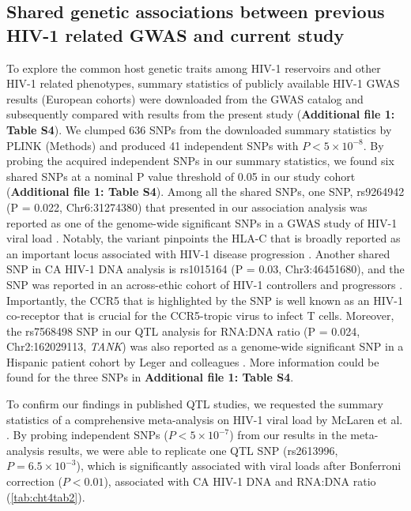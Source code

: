 \documentclass{book}
\begin{document}
\begin{refsection}
\subsection*{Shared genetic associations between previous HIV-1 related GWAS and current study}
To explore the common host genetic traits among HIV-1 reservoirs and other HIV-1 related phenotypes, summary statistics of publicly available HIV-1 GWAS results (European cohorts) were downloaded from the GWAS catalog \cite{Buniello2018The} and subsequently compared with results from the present study (\textbf{Additional file 1: Table S4}).
We clumped 636 SNPs from the downloaded summary statistics by PLINK \cite{Purcell2007PLINK} (Methods) and produced 41 independent SNPs with $P < 5 \times 10^{-8}$.
By probing the acquired independent SNPs in our summary statistics, we found six shared SNPs at a nominal P value threshold of 0.05 in our study cohort (\textbf{Additional file 1: Table S4}).
Among all the shared SNPs, one SNP, rs9264942 (P = 0.022, Chr6:31274380) that presented in our association analysis was reported as one of the genome-wide significant SNPs in a GWAS study of HIV-1 viral load \cite{Herráiz2017Impact}.
Notably, the variant pinpoints the HLA-C that is broadly reported as an important locus associated with HIV-1 disease progression \cite{Kulpa2011The}.
Another shared SNP in CA HIV-1 DNA analysis is rs1015164 (P = 0.03, Chr3:46451680), and the SNP was reported in an across-ethic cohort of HIV-1 controllers and progressors \cite{Author2010The}.
Importantly, the CCR5 that is highlighted by the SNP is well known as an HIV-1 co-receptor that is crucial for the CCR5-tropic virus to infect T cells.
Moreover, the rs7568498 SNP in our QTL analysis for RNA:DNA ratio (P = 0.024, Chr2:162029113, \textit{TANK}) was also reported as a genome-wide significant SNP in a Hispanic patient cohort by Leger and colleagues \cite{Leger2014Genome}.
More information could be found for the three SNPs in \textbf{Additional file 1: Table S4}.

To confirm our findings in published QTL studies, we requested the summary statistics of a comprehensive meta-analysis on HIV-1 viral load by McLaren et al. \cite{Murray2016The}.
By probing independent SNPs ($P < 5 \times 10^{-7}$) from our results in the meta-analysis results, we were able to replicate one QTL SNP (rs2613996, $P = 6.5 \times 10^{-3}$), which is significantly associated with viral loads after Bonferroni correction ($P < 0.01$), associated with CA HIV-1 DNA and RNA:DNA ratio (\ref{tab:cht4tab2}).


\end{refsection}
\end{document}
